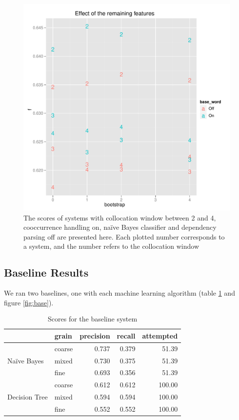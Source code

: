 \documentclass{article}
\newcommand{\naive}{na\"ive}
\newcommand{\Naive}{Na\"ive}
\begin{document}
\begin{figure}
\includegraphics[width=\textwidth]{pg_0004}
\caption{\label{fig4}The scores of systems with collocation window between 2 and 4, cooccurrence handling on, \naive{} Bayes classifier and dependency parsing off are presented here. Each plotted number corresponds to a system, and the number refers to the collocation window}
\end{figure}

\subsection{Baseline Results}

We ran two baselines, one with each machine learning algorithm (table \ref{tab:base} and figure \ref{fig:base}).

\begin{table}
\begin{tabular}{l l | r r r}
& grain& precision& recall& attempted\\
\hline
\multirow{3}{*}{\Naive{} Bayes} &
coarse  &  0.737 & 0.379 &   51.39\\
&mixed  &  0.730 & 0.375 &   51.39\\
& fine  &  0.693 & 0.356 &   51.39\\
\multirow{3}{*}{Decision Tree} &
coarse  &  0.612 & 0.612 &  100.00\\
&mixed  &  0.594 & 0.594 &  100.00\\
& fine  &  0.552 & 0.552 &  100.00\\
\end{tabular}
\caption{\label{tab:base}Scores for the baseline system}
\end{table}
\end{document}
